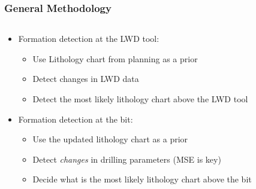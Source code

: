 \documentclass{beamer}
\begin{document}
\begin{frame} \frametitle{General Methodology} 
\vspace{-1cm}

\begin{columns}[onlytextwidth]
\begin{column}{0.6\textwidth}

\begin{itemize}
\item<1-> Formation detection at the LWD tool:
\begin{itemize}
\item<2-> Use Lithology chart from planning as a prior 
\item<3-> Detect changes in LWD data 
\item<4-> Detect the most likely lithology chart above the LWD tool
\end{itemize}

\item<5-> Formation detection at the bit:
\begin{itemize}
\item<6-> Use the updated lithology chart as a prior
\item<7-> Detect \emph{changes} in drilling parameters (MSE is key)
\item<8-> Decide what is the most likely lithology chart above the bit
\end{itemize}
\end{itemize}
  \end{column}

\begin{column}{0.4\textwidth}


\end{column}
\end{columns}

\end{frame}
\end{document}

